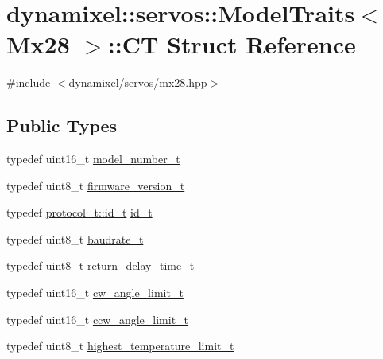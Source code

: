 \hypertarget{structdynamixel_1_1servos_1_1_model_traits_3_01_mx28_01_4_1_1_c_t}{}\section{dynamixel\+:\+:servos\+:\+:Model\+Traits$<$ Mx28 $>$\+:\+:CT Struct Reference}
\label{structdynamixel_1_1servos_1_1_model_traits_3_01_mx28_01_4_1_1_c_t}


{\ttfamily \#include $<$dynamixel/servos/mx28.\+hpp$>$}

\subsection*{Public Types}
\begin{DoxyCompactItemize}
\item 
typedef uint16\+\_\+t \hyperlink{structdynamixel_1_1servos_1_1_model_traits_3_01_mx28_01_4_1_1_c_t_aefe1a29d5146e147d135c1f0acb53505}{model\+\_\+number\+\_\+t}
\item 
typedef uint8\+\_\+t \hyperlink{structdynamixel_1_1servos_1_1_model_traits_3_01_mx28_01_4_1_1_c_t_a29a1406d5c42461a7c6a67f14a24995b}{firmware\+\_\+version\+\_\+t}
\item 
typedef \hyperlink{classdynamixel_1_1protocols_1_1_protocol1_a1d4dfa22b01f80b1876d14f539d52b5c}{protocol\+\_\+t\+::id\+\_\+t} \hyperlink{structdynamixel_1_1servos_1_1_model_traits_3_01_mx28_01_4_1_1_c_t_abeada4bb714b657c9e68b5659687719a}{id\+\_\+t}
\item 
typedef uint8\+\_\+t \hyperlink{structdynamixel_1_1servos_1_1_model_traits_3_01_mx28_01_4_1_1_c_t_a880f9df55e1318bbdd08349f2d37f943}{baudrate\+\_\+t}
\item 
typedef uint8\+\_\+t \hyperlink{structdynamixel_1_1servos_1_1_model_traits_3_01_mx28_01_4_1_1_c_t_acccaddb803e01784bbf2a188fb78d70c}{return\+\_\+delay\+\_\+time\+\_\+t}
\item 
typedef uint16\+\_\+t \hyperlink{structdynamixel_1_1servos_1_1_model_traits_3_01_mx28_01_4_1_1_c_t_a7df577b40348ee815a72655d99c36ea8}{cw\+\_\+angle\+\_\+limit\+\_\+t}
\item 
typedef uint16\+\_\+t \hyperlink{structdynamixel_1_1servos_1_1_model_traits_3_01_mx28_01_4_1_1_c_t_ac71e9003bdd4e822292228e7b14a852b}{ccw\+\_\+angle\+\_\+limit\+\_\+t}
\item 
typedef uint8\+\_\+t \hyperlink{structdynamixel_1_1servos_1_1_model_traits_3_01_mx28_01_4_1_1_c_t_a6da8442cdeb118bf11cf43248751f048}{highest\+\_\+temperature\+\_\+limit\+\_\+t}

\end{DoxyCompactItemize}
